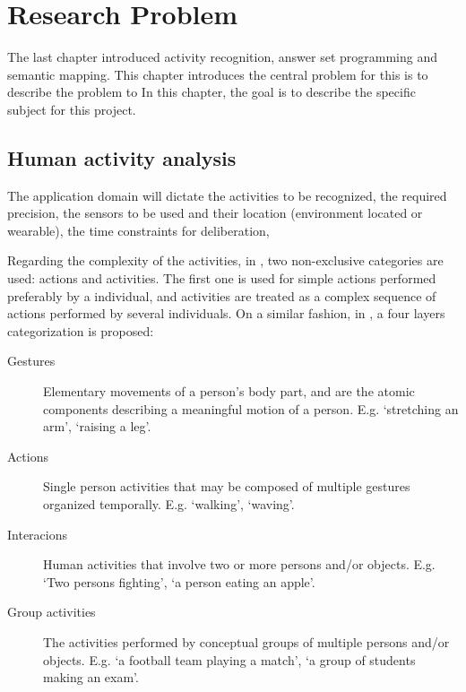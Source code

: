 \chapter{Research Problem}

The last chapter introduced activity recognition, answer set programming and semantic mapping.
This chapter introduces the central problem for this is to describe the problem to In this chapter, the goal is to describe the specific subject for this project.

\section{Human activity analysis}


The application domain will dictate the activities to be recognized, the required precision, the sensors to be used and their location (environment located or wearable), the time constraints for deliberation,





Regarding the complexity of the activities, in \citep{Turaga2008_MaRecHuAcSurv}, two non-exclusive categories are used: actions and activities.
The first one is used for simple actions performed preferably by a individual, and activities are treated as a complex sequence of actions performed by several individuals. 
On a similar fashion, in \citep{Aggarwal11_HumanActivity}, a four layers categorization is proposed:

\begin{description}
\item[Gestures] Elementary movements of a person's body part, and are the atomic components describing a meaningful motion of a person. 
E.g. `stretching an arm', `raising a leg'.
\item[Actions] Single person activities that may be composed of multiple gestures organized temporally. 
E.g. `walking', `waving'.
\item[Interacions] Human activities that involve two or more persons and/or objects. 
E.g. `Two persons fighting', `a person eating an apple'.
\item[Group activities] The activities performed by conceptual groups of multiple persons and/or objects. 
E.g. `a football team playing a match', `a group of students making an exam'.
\end{description}









